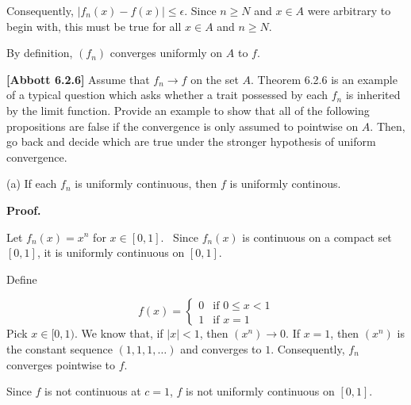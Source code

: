 \documentclass[10pt]{article}
\begin{document}
Consequently, $\displaystyle |f_{n}( x) -f( x) |\leq \epsilon $. Since $\displaystyle n\geq N$ and $\displaystyle x\in A$ were arbitrary to begin with, this must be true for all $\displaystyle x\in A$ and $\displaystyle n\geq N$. 



By definition, $\displaystyle ( f_{n})$ converges uniformly on $\displaystyle A$ to $\displaystyle f$.



\textbf{[Abbott 6.2.6]} Assume that $\displaystyle f_{n}\rightarrow f$ on the set $\displaystyle A$. Theorem 6.2.6 is an example of a typical question which asks whether a trait possessed by each $\displaystyle f_{n}$ is inherited by the limit function. Provide an example to show that all of the following propositions are false if the convergence is only assumed to pointwise on $\displaystyle A$. Then, go back and decide which are true under the stronger hypothesis of uniform convergence.



(a) If each $\displaystyle f_{n}$ is uniformly continuous, then $\displaystyle f$ is uniformly continous.



\textbf{Proof.}



Let $\displaystyle f_{n}( x) =x^{n}$ for $\displaystyle x\in [ 0,1]$. \ Since $\displaystyle f_{n}( x)$ is continuous on a compact set $\displaystyle [ 0,1]$, it is uniformly continuous on $\displaystyle [ 0,1]$. 



Define 


\begin{equation*}
f( x) =\begin{cases}
0 & \text{if } 0\leq x< 1\\
1 & \text{if } x=1
\end{cases}
\end{equation*}
Pick $\displaystyle x\in [ 0,1)$. We know that, if $\displaystyle |x|< 1$, then $\displaystyle \left( x^{n}\right)\rightarrow 0$. If $\displaystyle x=1$, then $\displaystyle \left( x^{n}\right)$ is the constant sequence $\displaystyle ( 1,1,1,\dotsc )$ and converges to $\displaystyle 1$. Consequently, $\displaystyle f_{n}$ converges pointwise to $\displaystyle f$. 



Since $\displaystyle f$ is not continuous at $\displaystyle c=1$, $\displaystyle f$ is not uniformly continuous on $\displaystyle [ 0,1]$.
\end{document}
